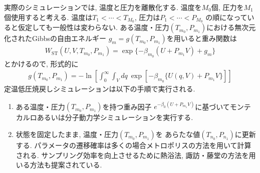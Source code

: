 実際のシミュレーションでは, 温度と圧力を離散化する.
温度を$M_{0}$個, 圧力を$M_{1}$個使用すると考える.
温度は$T_{1} < \cdots < T_{M_{0}}$, 圧力は$P_{1} < \cdots < P_{M_{0}}$
の順になっていると仮定しても一般性は変わらない.
ある温度・圧力$(T_{m_{0}}, P_{m_{1}})$における無次元化されたGibbsの自由エネルギー
$g_{m} = g (T_{m_{0}}, P_{m_{1}})$を用いると重み関数は
\begin{align}
 W_{\mathrm{ST}} (U, V, T_{m_{0}}, P_{m_{1}})
 =
 \exp \{ - \beta_{m_{0}} (U + P_{m_{1}} V) + g_{m} \}
\end{align}
とかけるので, 形式的に
\begin{align}
 g(T_{m_{0}}, P_{m_{1}})
 =
 - \ln \left[ \int_{0}^{\infty} \int_{V} dq~
              \exp [ -\beta_{m_{0}} \{ U(q,V) + P_{m_{1}}V \} ]
       \right]
\end{align}
定温低圧焼戻しシミュレーションは以下の手順で実行される.
\begin{enumerate}
 \item ある温度・圧力$(T_{m_{0}}, P_{m_{1}})$を持つ重み因子
       $e^{-\beta_{0} (U + P_{m_{1}} V)}$に基づいてモンテカルロあるいは分子動力学シミュレーションを実行する.
 \item 状態を固定したまま, 温度・圧力$(T_{m_{0}}, P_{m_{1}})$を
       あらたな値$(T_{n_{0}}, P_{n_{1}})$に更新する.
       パラメータの遷移確率は多くの場合メトロポリスの方法を用いて計算される.
       サンプリング効率を向上させるために熱浴法, 
       諏訪・藤堂の方法を用いる方法も提案されている.
\end{enumerate}






